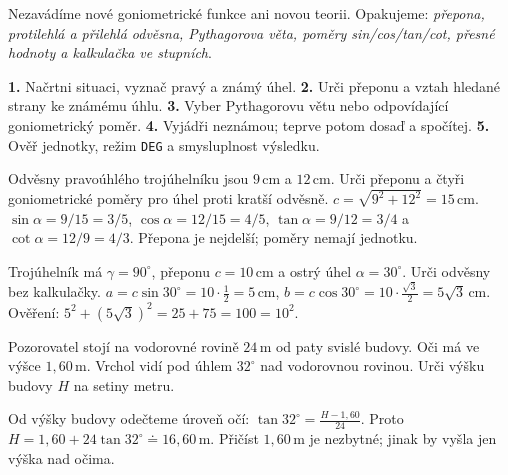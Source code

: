\documentclass[11pt,a4paper]{article}
\begin{document}
Nezavádíme nové goniometrické funkce ani novou teorii. Opakujeme:
\emph{přepona, protilehlá a přilehlá odvěsna, Pythagorova věta,
poměry sin/cos/tan/cot, přesné hodnoty a kalkulačka ve stupních}.
\begin{zadaniBox}[title={Postup - Řešení úlohy z pravoúhlého trojúhelníku}]
\textbf{1.} Načrtni situaci, vyznač pravý a známý úhel.
\textbf{2.} Urči přeponu a vztah hledané strany ke známému úhlu.
\textbf{3.} Vyber Pythagorovu větu nebo odpovídající goniometrický poměr.
\textbf{4.} Vyjádři neznámou; teprve potom dosaď a spočítej.
\textbf{5.} Ověř jednotky, režim \texttt{DEG} a smysluplnost výsledku.
\end{zadaniBox}

\begin{prikladReseniBox}[title={Příklad 1},breakable=false]
Odvěsny pravoúhlého trojúhelníku jsou $9\,\mathrm{cm}$ a $12\,\mathrm{cm}$.
Urči přeponu a čtyři goniometrické poměry pro úhel proti kratší odvěsně.
\tcblower
$c=\sqrt{9^2+12^2}=15\,\mathrm{cm}$.
$\sin\alpha=9/15=3/5$, $\cos\alpha=12/15=4/5$,
$\tan\alpha=9/12=3/4$ a $\cot\alpha=12/9=4/3$.
Přepona je nejdelší; poměry nemají jednotku.
\end{prikladReseniBox}
\begin{prikladReseniBox}[title={Příklad 2},breakable=false]
Trojúhelník má $\gamma=90^\circ$, přeponu $c=10\,\mathrm{cm}$
a ostrý úhel $\alpha=30^\circ$. Urči odvěsny bez kalkulačky.
\tcblower
$a=c\sin30^\circ=10\cdot\frac12=5\,\mathrm{cm}$,
$b=c\cos30^\circ=10\cdot\frac{\sqrt3}{2}=5\sqrt3\,\mathrm{cm}$.
Ověření: $5^2+(5\sqrt3)^2=25+75=100=10^2$.
\end{prikladReseniBox}

\begin{prikladReseniBox}[title={Příklad 3}]
Pozorovatel stojí na vodorovné rovině $24\,\mathrm m$ od paty svislé budovy.
Oči má ve výšce $1{,}60\,\mathrm m$. Vrchol vidí pod úhlem $32^\circ$
nad vodorovnou rovinou. Urči výšku budovy $H$ na setiny metru.
\tcblower
\begin{center}
\end{center}
Od výšky budovy odečteme úroveň očí:
$\tan32^\circ=\frac{H-1{,}60}{24}$.
Proto $H=1{,}60+24\tan32^\circ\doteq16{,}60\,\mathrm m$.
Přičíst $1{,}60\,\mathrm m$ je nezbytné; jinak by vyšla jen výška nad očima.
\end{prikladReseniBox}
\end{document}
